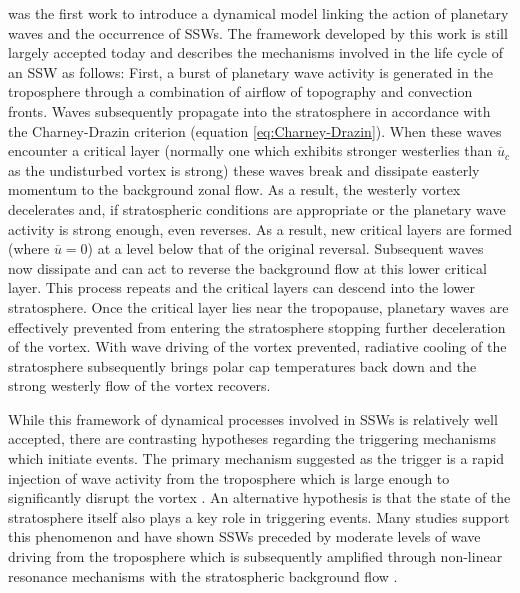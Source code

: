 \cite{matsunoDynamical1971b} was the first work to introduce a dynamical model linking the action of planetary waves and the occurrence of SSWs. The framework developed by this work is still largely accepted today and describes the mechanisms involved in the life cycle of an SSW as follows: First, a burst of planetary wave activity is generated in the troposphere through a combination of airflow of topography and convection fronts. Waves subsequently propagate into the stratosphere in accordance with the Charney-Drazin criterion (equation \ref{eq:Charney-Drazin}). When these waves encounter a critical layer (normally one which exhibits stronger westerlies than $\overline{u}_c$ as the undisturbed vortex is strong) these waves break and dissipate easterly momentum to the background zonal flow. As a result, the westerly vortex decelerates and, if stratospheric conditions are appropriate or the planetary wave activity is strong enough, even reverses. As a result, new critical layers are formed (where $\overline{u} = 0$) at a level below that of the original reversal. Subsequent waves now dissipate and can act to reverse the background flow at this lower critical layer. This process repeats and the critical layers can descend into the lower stratosphere. Once the critical layer lies near the tropopause, planetary waves are effectively prevented from entering the stratosphere stopping further deceleration of the vortex. With wave driving of the vortex prevented, radiative cooling of the stratosphere subsequently brings polar cap temperatures back down and the strong westerly flow of the vortex recovers.

While this framework of dynamical processes involved in SSWs is relatively well accepted, there are contrasting hypotheses regarding the triggering mechanisms which initiate events. The primary mechanism suggested as the trigger is a rapid injection of wave activity from the troposphere which is large enough to significantly disrupt the vortex \citep{matsunoDynamical1971b, limpasuvanLife2004b, manneyAura2009b, nishiiModulations2009b, kuttippurathComparative2012b}. An alternative hypothesis is that the state of the stratosphere itself also plays a key role in triggering events. Many studies support this phenomenon and have shown SSWs preceded by moderate levels of wave driving from the troposphere which is subsequently amplified through non-linear resonance mechanisms with the stratospheric background flow \citep{eslerExcitation2005b, scottInternal2006b, eslerStratospheric2011a}.

